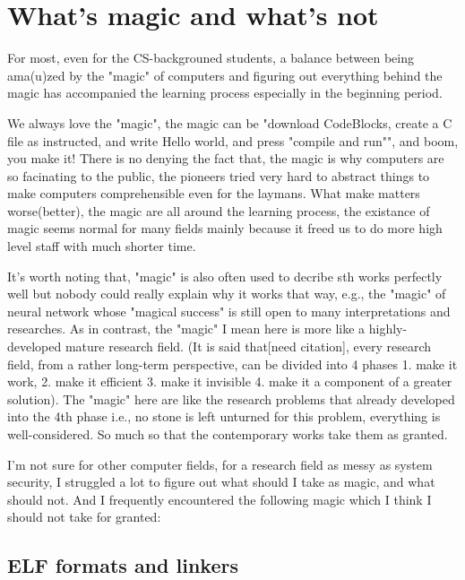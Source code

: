 \section{What's magic and what's not}
\label{sec:magic}
For most, even for the CS-backgrouned students, a balance between being ama(u)zed by the "magic" of computers and figuring out everything behind the magic 
has accompanied the learning process especially in the beginning period.

We always love the "magic", the magic can be "download CodeBlocks, create a C file as instructed, and write Hello world, and press "compile and run"", and boom, you make it!
There is no denying the fact that, the magic is why computers are so facinating to the public, the pioneers tried very hard to abstract things to make computers comprehensible even for the laymans. 
What make matters worse(better), the magic are all around the learning process, the existance of magic seems normal for many fields mainly because it freed us to do more high level staff with much shorter time.

It's worth noting that, "magic" is also often used to decribe sth works perfectly well but nobody could really explain why it works that way,
e.g., the "magic" of neural network whose "magical success" is still open to many interpretations and researches.
As in contrast, the "magic" I mean here is more like a highly-developed mature research field.
(It is said that[need citation], every research field, from a rather long-term perspective, can be divided into 4 phases 1. make it work, 2. make it efficient 3. make it invisible 4. make it a component of a greater solution).
The "magic" here are like the research problems that already developed into the 4th phase i.e., no stone is left unturned for this problem, everything is well-considered.
So much so that the contemporary works take them as granted. 

I'm not sure for other computer fields, for a research field as messy as system security, I struggled a lot to figure out what should I take as magic, and what should not.
And I frequently encountered the following magic which I think I should not take for granted: 
\subsection{ELF formats and linkers}
